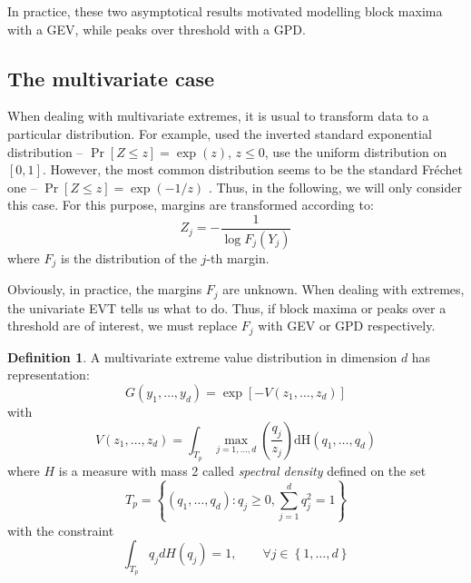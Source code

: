 \documentclass[11pt,a4paper]{article}
\numberwithin{equation}{section}
\theoremstyle{definition}
\newtheorem{defi}{Definition}[subsection]
\begin{document}
In practice, these two asymptotical results motivated modelling block
maxima with a GEV, while peaks over threshold with a GPD.

\subsection{The multivariate case}
\label{subsec:multiv}

When dealing with multivariate extremes, it is usual to transform data
to a particular distribution. For example, \citet{Falk2005} used the
inverted standard exponential distribution -- $\Pr[Z \leq z ] =
\exp(z)$, $z \leq 0$, \citet{Coles1999} use the uniform distribution
on $[0,1]$. However, the most common distribution seems to be the
standard Fr\'echet one -- $\Pr[Z \leq z] = \exp(-1/z)$
\citep{Smith1994,Smith1997,Bortot2000}. Thus, in the following, we
will only consider this case. For this purpose, margins are
transformed according to:
\begin{displaymath}
  Z_j = - \frac{1}{\log F_j \left( Y_j \right)}
\end{displaymath}
where $F_j$ is the distribution of the $j$-th margin.

Obviously, in practice, the margins $F_j$ are unknown. When dealing
with extremes, the univariate EVT tells us what to do. Thus, if block
maxima or peaks over a threshold are of interest, we must replace
$F_j$ with GEV or GPD respectively.

\begin{defi}
  A multivariate extreme value distribution in dimension $d$ has
  representation:
  \begin{equation}
    \label{eq:expMesRep}
    G\left(y_1, \ldots, y_d \right) = \exp\left[-V\left(z_1, \ldots,
        z_d \right) \right]
  \end{equation}
  with
  \begin{displaymath}
    V(z_1, \ldots, z_d) = \int_{T_p} \max_{j=1,\ldots,d}
    \left(\frac{q_j}{z_j} \right) \mbox{dH}\left(q_1,
      \ldots,q_d\right) 
  \end{displaymath}
  where $H$ is a measure with mass 2 called \emph{spectral density}
  defined on the set
  \begin{displaymath}
    T_p = \left\{ \left(q_1, \ldots, q_d \right) : q_j \geq 0,
    \sum_{j=1}^d q_j^2 = 1 \right\}
  \end{displaymath}
  with the constraint
  \begin{displaymath}
    \int_{T_p} q_jdH(q_j) = 1, \qquad \forall j \in \left\{1, \ldots,
      d\right\}
  \end{displaymath}
\end{defi}
\end{document}
